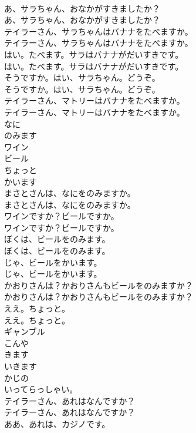 \documentclass[8pt]{extreport}
\begin{document}
\begin{CJK}{UTF8}{min}
\\	あ、サラちゃん、おなかがすきましたか？	
\\	あ、サラちゃん、おなかがすきましたか？ 
\\	テイラーさん、サラちゃんはバナナをたべますか。	
\\	テイラーさん、サラちゃんはバナナをたべますか。 
\\	はい。たべます。サラはバナナがだいすきです。	
\\	はい。たべます。サラはバナナがだいすきです。 
\\	そうですか。はい、サラちゃん。どうぞ。	
\\	そうですか。はい、サラちゃん。どうぞ。 
\\	テイラーさん、マトリーはバナナをたべますか。	
\\	テイラーさん、マトリーはバナナをたべますか。 
\\	なに
\\	のみます
\\	ワイン
\\	ビール
\\	ちょっと
\\	かいます
\\	まさとさんは、なにをのみますか。	
\\	まさとさんは、なにをのみますか。 
\\	ワインですか？ビールですか。	
\\	ワインですか？ビールですか。 
\\	ぼくは、ビールをのみます。	
\\	ぼくは、ビールをのみます。 
\\	じゃ、ビールをかいます。	
\\	じゃ、ビールをかいます。 
\\	かおりさんは？かおりさんもビールをのみますか？	
\\	かおりさんは？かおりさんもビールをのみますか？ 
\\	ええ。ちょっと。	
\\	ええ。ちょっと。 
\\	ギャンブル
\\	こんや
\\	きます
\\	いきます
\\	かじの
\\	いってらっしゃい。
\\	テイラーさん、あれはなんですか？	
\\	テイラーさん、あれはなんですか？ 
\\	ああ、あれは、カジノです。	

\end{CJK}
\end{document}
